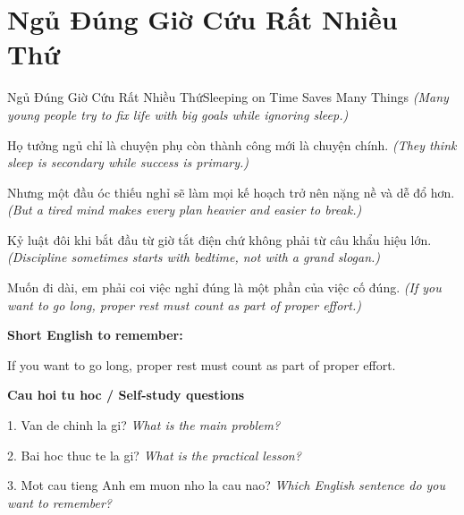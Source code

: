 \section{Ngủ Đúng Giờ Cứu Rất Nhiều Thứ}
\begin{truyen}{Ngủ Đúng Giờ Cứu Rất Nhiều Thứ}{Sleeping on Time Saves Many Things}
\textit{(Many young people try to fix life with big goals while ignoring sleep.)}

Họ tưởng ngủ chỉ là chuyện phụ còn thành công mới là chuyện chính.
\textit{(They think sleep is secondary while success is primary.)}

Nhưng một đầu óc thiếu nghỉ sẽ làm mọi kế hoạch trở nên nặng nề và dễ đổ hơn.
\textit{(But a tired mind makes every plan heavier and easier to break.)}

Kỷ luật đôi khi bắt đầu từ giờ tắt điện chứ không phải từ câu khẩu hiệu lớn.
\textit{(Discipline sometimes starts with bedtime, not with a grand slogan.)}

\end{truyen}

\begin{baihoc}
Muốn đi dài, em phải coi việc nghỉ đúng là một phần của việc cố đúng.
\textit{(If you want to go long, proper rest must count as part of proper effort.)}
\end{baihoc}

\begin{ghinhoanh}
\textbf{Short English to remember:}

If you want to go long, proper rest must count as part of proper effort.

\end{ghinhoanh}

\begin{tuhocnhanh}
\textbf{Cau hoi tu hoc / Self-study questions}

1. Van de chinh la gi? \textit{What is the main problem?}

2. Bai hoc thuc te la gi? \textit{What is the practical lesson?}

3. Mot cau tieng Anh em muon nho la cau nao? \textit{Which English sentence do you want to remember?}
\end{tuhocnhanh}
\ngancach


